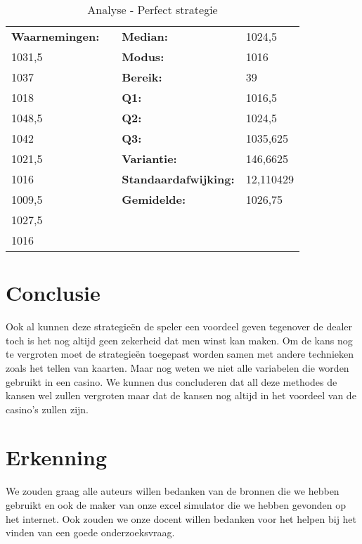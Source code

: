 \documentclass[conference]{IEEEtran}
\begin{document}
\begin{table}[htbp]
\caption{Analyse - Perfect strategie}
\tiny
\centering
\begin{tabular}{|l|lll}
\cline{1-1} \cline{3-4}
\textbf{Waarnemingen:} & \multicolumn{1}{l|}{} & \multicolumn{1}{l|}{\textbf{Median:}} & \multicolumn{1}{l|}{1024,5} \\ \cline{1-1} \cline{3-4} 
1031,5 & \multicolumn{1}{l|}{} & \multicolumn{1}{l|}{\textbf{Modus:}} & \multicolumn{1}{l|}{1016} \\ \cline{1-1} \cline{3-4} 
1037 & \multicolumn{1}{l|}{} & \multicolumn{1}{l|}{\textbf{Bereik:}} & \multicolumn{1}{l|}{39} \\ \cline{1-1} \cline{3-4} 
1018 & \multicolumn{1}{l|}{} & \multicolumn{1}{l|}{\textbf{Q1:}} & \multicolumn{1}{l|}{1016,5} \\ \cline{1-1} \cline{3-4} 
1048,5 & \multicolumn{1}{l|}{} & \multicolumn{1}{l|}{\textbf{Q2:}} & \multicolumn{1}{l|}{1024,5} \\ \cline{1-1} \cline{3-4} 
1042 & \multicolumn{1}{l|}{} & \multicolumn{1}{l|}{\textbf{Q3:}} & \multicolumn{1}{l|}{1035,625} \\ \cline{1-1} \cline{3-4} 
1021,5 & \multicolumn{1}{l|}{} & \multicolumn{1}{l|}{\textbf{Variantie:}} & \multicolumn{1}{l|}{146,6625} \\ \cline{1-1} \cline{3-4} 
1016 & \multicolumn{1}{l|}{} & \multicolumn{1}{l|}{\textbf{Standaardafwijking:}} & \multicolumn{1}{l|}{12,110429} \\ \cline{1-1} \cline{3-4} 
1009,5 & \multicolumn{1}{l|}{} & \multicolumn{1}{l|}{\textbf{Gemidelde:}} & \multicolumn{1}{l|}{1026,75} \\ \cline{1-1} \cline{3-4} 
1027,5 &  &  &  \\ \cline{1-1}
1016 &  & \textbf{} &  \\ \cline{1-1}
\end{tabular}
\end{table}

\section{Conclusie}
Ook al kunnen deze strategie\"{e}n de speler een voordeel geven tegenover de dealer toch is het nog altijd geen zekerheid dat men winst kan maken. Om de kans nog te vergroten moet de strategie\"{e}n toegepast worden samen met andere technieken zoals het tellen van kaarten. Maar nog  weten we niet alle variabelen die worden gebruikt in een casino. We kunnen dus concluderen dat all deze methodes de kansen wel zullen vergroten maar dat de kansen nog altijd in het voordeel van de casino's zullen zijn.

\section*{Erkenning}

We zouden graag alle auteurs willen bedanken van de bronnen die we hebben gebruikt en ook de maker van onze excel simulator die we hebben gevonden op het internet. Ook zouden we onze docent willen bedanken voor het helpen bij het vinden van een goede onderzoeksvraag.
\nocite{*}



\end{document}
